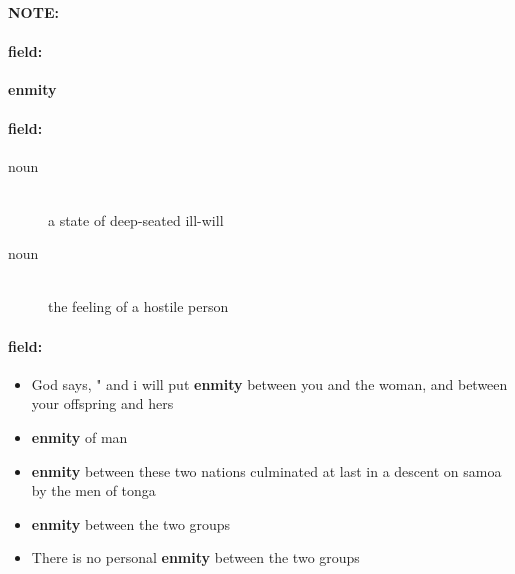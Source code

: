 \documentclass[12pt]{article}
\newenvironment{note}{\paragraph{NOTE:}}{}
\newenvironment{field}{\paragraph{field:}}{}
\begin{document}
\begin{note}
\begin{field}
\textbf{\large enmity}
\end{field}


\begin{field}
\begin{description}
\item[noun] \hfill \\ 
a state of deep-seated ill-will

\item[noun] \hfill \\ 
the feeling of a hostile person

\end{description}
\end{field}

\begin{field}
\begin{itemize}
\item God says, " and i will put \textbf{enmity} between you and the woman, and between your offspring and hers
\item \textbf{enmity} of man
\item \textbf{enmity} between these two nations culminated at last in a descent on samoa by the men of tonga
\item \textbf{enmity} between the two groups
\item There is no personal \textbf{enmity} between the two groups
\end{itemize}
\end{field}
\end{note}
\end{document}
